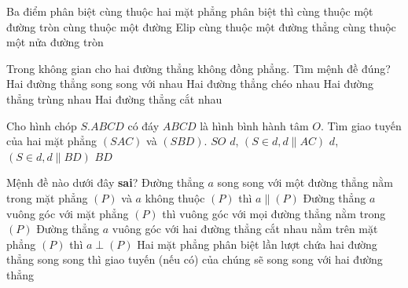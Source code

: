 \begin{ex}%
	Ba điểm phân biệt cùng thuộc hai mặt phẳng phân biệt thì
	\choice
	{cùng thuộc một đường tròn}
	{cùng thuộc một đường Elip}
	{\True cùng thuộc một đường thẳng}
	{cùng thuộc một nửa đường tròn}
\end{ex}

\begin{ex}%
	Trong không gian cho hai đường thẳng không đồng phẳng. Tìm mệnh đề đúng?
	\choice
	{Hai đường thẳng song song với nhau}
	{\True Hai đường thẳng chéo nhau}
	{Hai đường thẳng trùng nhau}
	{Hai đường thẳng cắt nhau}
\end{ex}

\begin{ex}%
	Cho hình chóp $S.ABCD$ có đáy $ABCD$ là hình bình hành tâm $O$. Tìm giao tuyến của hai mặt phẳng $(SAC)$ và $(SBD)$.
	\choice
	{\True $SO$}
	{$d$, $(S \in d, d \parallel AC)$}
	{$d$, $(S \in d, d \parallel BD)$}
	{$BD$}
\end{ex}

\begin{ex}%
	Mệnh đề nào dưới đây \textbf{sai}?
	\choice
	{Đường thẳng $a$ song song với một đường thẳng nằm trong mặt phẳng $(P)$ và $a$ không thuộc $(P)$ thì $a \parallel  (P)$}
	{Đường thẳng $a$ vuông góc với mặt phẳng $(P)$ thì vuông góc với mọi đường thẳng nằm trong $(P)$}
	{Đường thẳng $a$ vuông góc với hai đường thẳng cắt nhau nằm trên mặt phẳng $(P)$ thì $a \perp (P)$}
	{\True Hai mặt phẳng phân biệt lần lượt chứa hai đường thẳng song song thì giao tuyến (nếu có) của chúng sẽ song song với hai đường thẳng}
\end{ex}

